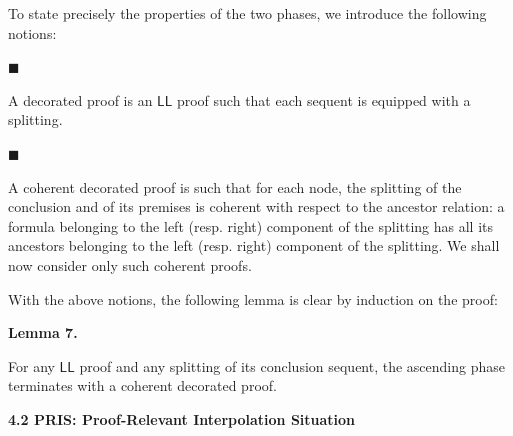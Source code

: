 \documentclass[10pt,a4paper]{article}
\begin{document}
 
 
To state precisely the properties of the two phases, we introduce the following notions:\par
  
\par\noindent  $\blacksquare$ 
 
A decorated proof is an $\mathsf{LL}$ proof such that each sequent is equipped with a splitting.\par
 
 
 
\par\noindent  $\blacksquare$ 
 
A coherent decorated proof is such that for each node, the splitting of the conclusion and of its premises is coherent with respect to the ancestor relation: a formula belonging to the left (resp. right) component of the splitting has all its ancestors belonging to the left (resp. right) component of the splitting. We shall now consider only such coherent proofs.\par
 
 
  
 
 
With the above notions, the following lemma is clear by induction on the proof:\par
 
 
 
\par\medskip\noindent\textbf{Lemma 7.}\par
 
 
For any $\mathsf{LL}$ proof and any splitting of its conclusion sequent, the ascending phase terminates with a coherent decorated proof.\par
 
 
 
 
 
\par\medskip\noindent\textbf{4.2 PRIS: Proof-Relevant Interpolation Situation}\par
 
\end{document}
